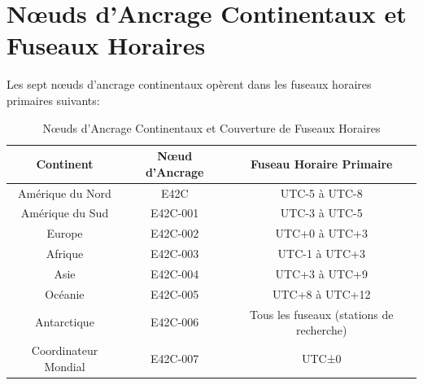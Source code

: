 \documentclass[12pt]{article}
\begin{document}
\section{Nœuds d'Ancrage Continentaux et Fuseaux Horaires}

Les sept nœuds d'ancrage continentaux opèrent dans les fuseaux horaires primaires suivants:

\begin{table}[h]
\centering
\begin{tabular}{|c|c|c|}
\hline
\textbf{Continent} & \textbf{Nœud d'Ancrage} & \textbf{Fuseau Horaire Primaire} \\
\hline
Amérique du Nord & E42C & UTC-5 à UTC-8 \\
\hline
Amérique du Sud & E42C-001 & UTC-3 à UTC-5 \\
\hline
Europe & E42C-002 & UTC+0 à UTC+3 \\
\hline
Afrique & E42C-003 & UTC-1 à UTC+3 \\
\hline
Asie & E42C-004 & UTC+3 à UTC+9 \\
\hline
Océanie & E42C-005 & UTC+8 à UTC+12 \\
\hline
Antarctique & E42C-006 & Tous les fuseaux (stations de recherche) \\
\hline
Coordinateur Mondial & E42C-007 & UTC±0 \\
\hline
\end{tabular}
\caption{Nœuds d'Ancrage Continentaux et Couverture de Fuseaux Horaires}
\end{table}
\end{document}
